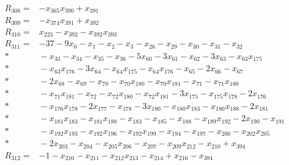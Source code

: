 \begin{align*}
R_{308}={}&-x_{365}x_{390}+x_{391}\\[3pt]
R_{309}={}&-x_{374}x_{391}+x_{392}\\[3pt]
R_{310}={}&x_{223}-x_{392}-x_{392}x_{393}\\[3pt]
R_{311}={}&-37-9x_{0}-x_{1}-x_{2}-x_{3}-x_{26}-x_{29}-x_{30}-x_{31}-x_{32}\\*
&{}-x_{33}-x_{34}-x_{35}-x_{36}-5x_{60}-3x_{61}-x_{62}-3x_{63}-x_{63}x_{175}\\*
&{}-x_{63}x_{176}-3x_{64}-x_{64}x_{175}-x_{64}x_{176}-x_{65}-2x_{66}-x_{67}\\*
&{}-2x_{68}-x_{69}-x_{70}-x_{70}x_{180}-x_{70}x_{181}-x_{71}-x_{71}x_{180}\\*
&{}-x_{71}x_{181}-x_{72}-x_{72}x_{180}-x_{72}x_{181}-3x_{175}-x_{175}x_{178}-2x_{176}\\*
&{}-x_{176}x_{178}-2x_{177}-x_{178}-3x_{180}-x_{180}x_{183}-x_{180}x_{188}-2x_{181}\\*
&{}-x_{181}x_{183}-x_{181}x_{188}-x_{183}-x_{185}-x_{188}-x_{189}x_{192}-2x_{190}-x_{191}\\*
&{}-x_{192}x_{193}-x_{192}x_{196}-x_{192}x_{199}-x_{194}-x_{197}-x_{200}-x_{202}x_{205}\\*
&{}-2x_{203}-x_{204}-x_{205}x_{206}-x_{207}-x_{209}x_{212}-x_{210}+x_{394}\\[3pt]
R_{312}={}&-1-x_{210}-x_{211}-x_{212}x_{213}-x_{214}+x_{216}-x_{394}\\[3pt]
\end{align*}
\endgroup
